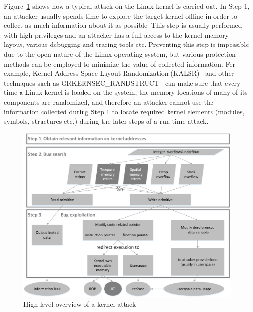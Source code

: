 Figure~\ref{fig:exploit-steps} shows how a typical attack on the Linux kernel is carried out. In Step 1, an attacker usually spends time to explore the target kernel offline in order to collect as much information about it as possible. This step is usually performed with high privileges and an attacker has a full access to the kernel memory layout, various debugging and tracing tools etc. Preventing this step is impossible due to the open nature of the Linux operating system, but various protection methods can be employed to minimize the value of collected information. For example, Kernel Address Space Layout Randomization (KALSR)~\cite{cook2013} and other techniques such as GRKERNSEC\_RANDSTRUCT~\cite{randstruct2017} can make sure that every time a Linux kernel is loaded on the system, the memory locations of many of its components are randomized, and therefore an attacker cannot use the information collected during Step 1 to locate required kernel elements (modules, symbols, structures etc.) during the later steps of a run-time attack. 

\begin{figure}[t]
	\centering
		\includegraphics[width=1\textwidth]{figures/kernel_exploit_steps.png}
	\caption{High-level overview of a kernel attack}
	\label{fig:exploit-steps}
\end{figure}    

